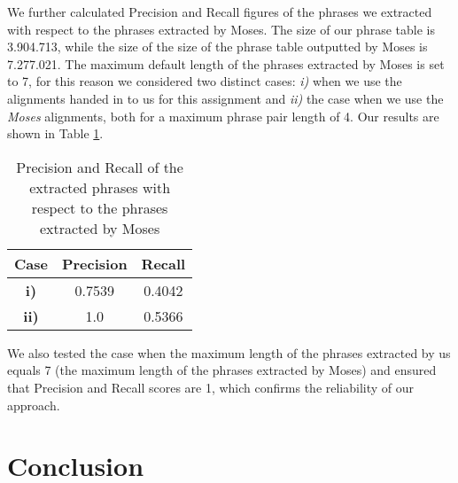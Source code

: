 \documentclass[11pt]{article}
\begin{document}
We further calculated Precision and Recall figures of the phrases we extracted with respect to the phrases extracted by Moses. The size of our phrase table is 3.904.713, while the size of the size of the phrase table outputted by Moses is 7.277.021. The maximum default length of the phrases extracted by Moses is set to 7, for this reason we considered two distinct cases: \textit{i)} when we use the alignments handed in to us for this assignment and \textit{ii)} the case when we use the \textit{Moses} alignments, both for a maximum phrase pair length of 4. Our results are shown in Table \ref{PR}.

\begin{table}[h]
\centering
\begin{tabular}{ c c c}
  \hline \hline
  \textbf{Case} & \textbf{Precision} & \textbf{Recall} \\
  \hline \hline
  \textbf{i)} &  0.7539 & 0.4042 \\
  \textbf{ii)} & 1.0 & 0.5366 \\
  \hline
\end{tabular}
\caption{Precision and Recall of the extracted phrases with respect to the phrases extracted by Moses}
\label{PR}
\end{table}

We also tested the case when the maximum length of the phrases extracted by us equals 7 (the maximum length of the phrases extracted by Moses) and ensured that Precision and Recall scores are 1, which confirms the reliability of our approach.



\section{Conclusion}
\label{Concl}
\end{document}
